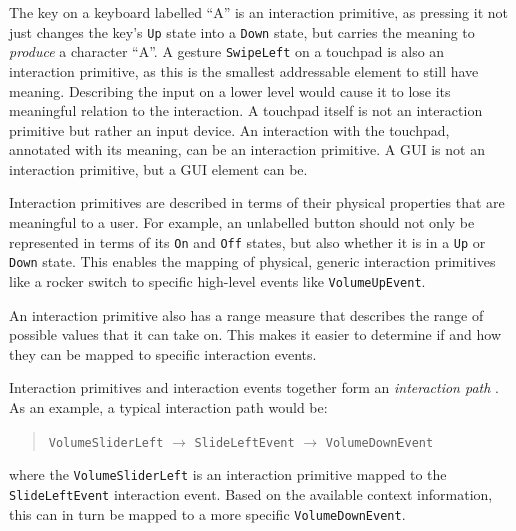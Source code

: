 The key on a keyboard labelled ``A'' is an interaction primitive, as pressing it not just changes the key's \texttt{Up} state into a \texttt{Down} state, but carries the meaning to \emph{produce} a character ``A''. A gesture \texttt{SwipeLeft} on a touchpad is also an interaction primitive, as this is the smallest addressable element to still have meaning. Describing the input on a lower level would cause it to lose its meaningful relation to the interaction. A touchpad itself is not an interaction primitive but rather an input device. An interaction with the touchpad, annotated with its meaning, can be an interaction primitive. A \ac{GUI} is not an interaction primitive, but a \ac{GUI} element can be.

Interaction primitives are described in terms of their physical properties that are meaningful to a user. For example, an unlabelled button should not only be represented in terms of its \texttt{On} and \texttt{Off} states, but also whether it is in a \texttt{Up} or \texttt{Down} state. This enables the mapping of physical, generic interaction primitives like a rocker switch to specific high-level events like \texttt{VolumeUpEvent}.

An interaction primitive also has a range measure that describes the range of possible values that it can take on. This makes it easier to determine if and how they can be mapped to specific interaction events.

Interaction primitives and interaction events together form an \emph{interaction path} \cite{Dubois2008}. As an example, a typical interaction path would be:
\label{interactionPath}

\begin{quote}\noindent
\texttt{VolumeSliderLeft} $\rightarrow$ \texttt{SlideLeftEvent} $\rightarrow$ \texttt{VolumeDownEvent}
\end{quote}

where the \texttt{VolumeSliderLeft} is an interaction primitive mapped to the \texttt{SlideLeftEvent} interaction event. Based on the available context information, this can in turn be mapped to a more specific \texttt{Volume\-Down\-Event}.



